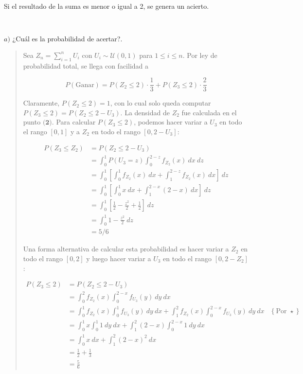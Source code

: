 \documentclass[a4paper, 12pt]{article}
\begin{document}
Si el resultado de la suma es menor o igual a 2, se genera un acierto.

~

$a)$ ¿Cuál es la probabilidad de acertar?.


\small
\begin{quote}

Sea $Z_n = \sum_{i=1}^n U_i$ con $U_i \sim \mathcal{U}(0, 1)$ para $1 \leq i
\leq n$. Por ley de probabilidad total, se llega con facilidad a

\begin{equation*}
  P(\text{Ganar}) = P(Z_2 \leq 2) \cdot \frac{1}{3} + P(Z_3 \leq 2) \cdot
  \frac{2}{3}
\end{equation*}

Claramente, $P(Z_2 \leq 2) = 1$, con lo cual solo queda computar $P(Z_3 \leq
2) = P(Z_2 \leq 2 - U_3)$. La densidad de $Z_2$ fue calculada en el punto
$\textbf{(2)}$. Para calcular $P(Z_3 \leq 2)$, podemos hacer variar a $U_3$ en
todo el rango $[0, 1]$ y a $Z_2$ en todo el rango $[ 0, 2 - U_3 ]$:

\begin{align*}
  P(Z_3 \leq Z_2) 
  &= P(Z_2 \leq 2 - U_3) \\ 
  &=\int_0^1 P(U_3 = z) \int_{0}^{2-z} f_{Z_2}(x) ~ dx ~ dz \\ 
  &=\int_0^1 \left[ \int_0^1 f_{Z_2}(x) ~ dx + \int_1^{2 - z} f_{Z_2}(x) ~ dx
  \right] ~ dz \\ 
  &=\int_0^1 \left[ \int_0^1 x ~ dx + \int_1^{2-x}(2-x) ~ dx  \right] ~ dz \\ 
  &= \int_0^1 \left[ \frac{1}{2} - \frac{z^2}{2} + \frac{1}{2}\right]  ~ dz \\ 
  &=\int_0^1 1 - \frac{z^2}{2} ~ dz \\ 
  &= 5 / 6
\end{align*}


Una forma alternativa de calcular esta probabilidad es hacer variar a $Z_2$ en
todo el rango $[0, 2]$ y luego hacer variar a $U_3$ en todo el rango $[0, 2 -
Z_2]$:

\begin{align*}
  P(Z_3 \leq 2) 
  &=P(Z_2 \leq 2 - U_3)\\
  &= \int_0^2 f_{Z_2}(x) \int_0^{2-x} f_{U_3}(y) ~ dy ~ dx \\ 
  &= \int_0^1 f_{Z_2}(x) \int_0^{1} f_{U_3}(y) ~ dy ~ dx + \int_1^2 f_{Z_2}(x)
  \int_0^{2-x} f_{U_3}(y) ~ dy ~ dx &\left\{ \text{Por } \star \right\}  \\
                                    &=\int_0^1 x \int_0^1 1 ~ dy ~ dx +
                                    \int_{1}^2 (2-x) \int_0^{2 - x} 1 ~ dy ~ dx\\
  &=\int_0^1 x ~ dx + \int_1^2 (2-x)^2 ~ dx \\
  &=\frac{1}{2} + \frac{1}{3} \\ 
  &= \frac{5}{6}
\end{align*}


\end{quote}
\end{document}
